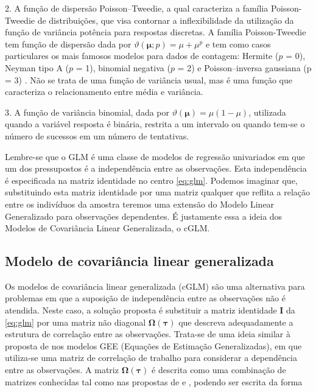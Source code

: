 2. A função de dispersão Poisson–Tweedie, a qual caracteriza a família Poisson-Tweedie de distribuições, que visa contornar a inflexibilidade da utilização da função de variância potência para  respostas discretas. A família Poisson-Tweedie tem função de dispersão dada por $\vartheta\left(\boldsymbol{\mu}; p\right) = \mu + \mu^p$ e tem como casos particulares os mais famosos modelos para dados de contagem: Hermite ($p$ = 0), Neyman tipo A ($p$ = 1), binomial negativa ($p$ = 2) e Poisson–inversa gaussiana (p = $3$) \citep{Jorgensen15}. Não se trata de uma função de variância usual, mas é uma função que caracteriza o relacionamento entre média e variância.

3. A função de variância binomial, dada por $\vartheta(\boldsymbol{\mu}) = \mu(1 - \mu)$, utilizada quando a variável resposta é binária, restrita a um intervalo ou quando tem-se o  número de sucessos em um número de tentativas.

Lembre-se que o GLM é uma classe de modelos de regressão univariados em que um dos pressupostos é a independência entre as observações. Esta independência é especificada na matriz identidade no centro \autoref{eq:glm}. Podemos imaginar que, substituindo esta matriz identidade por uma matriz qualquer que reflita a relação entre os indivíduos da amostra teremos uma extensão do Modelo Linear Generalizado para observações dependentes. É justamente essa a ideia dos Modelos de Covariância Linear Generalizada, o cGLM.

\subsection{Modelo de covariância linear generalizada}

Os modelos de covariância linear generalizada (cGLM) são uma alternativa para problemas em que a suposição de independência entre as observações não é atendida. Neste caso, a solução proposta é substituir a matriz identidade $\boldsymbol{I}$ da \autoref{eq:glm} por uma matriz não diagonal $\boldsymbol{\Omega({\tau})}$ que descreva adequadamente a estrutura de correlação entre as observações. Trata-se de uma ideia similar à proposta de \citet{Liang86} nos modelos GEE (Equações de Estimação Generalizadas), em que utiliza-se uma matriz de correlação de trabalho para considerar a dependência entre as observações. A matriz $\boldsymbol{\Omega({\tau})}$ é descrita como uma combinação de matrizes conhecidas tal como nas propostas de \citet{Anderson73} e \citet{Pourahmadi00}, podendo ser escrita da forma

